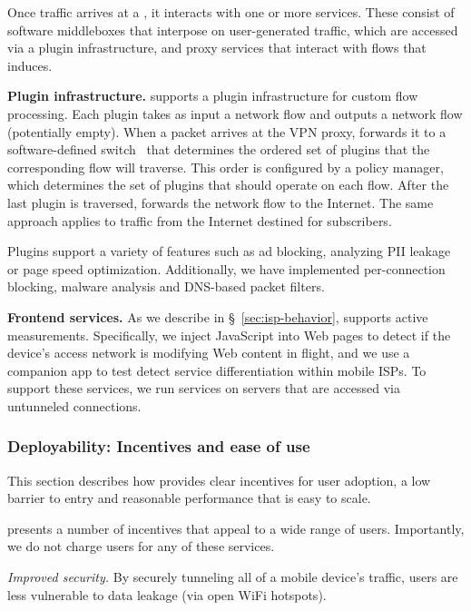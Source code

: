 Once traffic arrives at a \meddlebox, it interacts with one or more 
services. These consist of software middleboxes that interpose on 
user-generated traffic, which are accessed 
via a plugin infrastructure, and proxy services that interact with 
flows that \meddle induces.  

\noindent\textbf{Plugin infrastructure.}
\platname{} supports a plugin
infrastructure for custom flow processing. Each plugin takes as input a 
network flow and outputs a network flow (potentially empty). 
When a packet arrives at the VPN proxy, \meddle forwards it to a software-defined switch~\cite{Openvswitch} that 
determines the ordered set of plugins that the corresponding flow will traverse. 
This order is configured by a policy manager, which determines 
the set of plugins that should operate on each flow. After the last 
plugin is traversed, \meddle forwards the network flow to the Internet. 
The same approach applies to traffic from the Internet destined for \meddle subscribers. 

Plugins support a variety of features such as ad blocking, 
analyzing PII leakage or page speed optimization. Additionally, we have implemented 
per-connection blocking, malware analysis and DNS-based packet filters. 

\noindent\textbf{Frontend services.} As we describe in \S~\ref{sec:isp-behavior}, 
\meddle supports active measurements. 
Specifically, we inject JavaScript into Web pages to detect if the device's 
access network is modifying Web content in flight, and we use a companion app to 
test detect service differentiation within mobile ISPs. To support these services, we 
run services on \meddle servers that are accessed via untunneled connections. 

\subsubsection{Deployability: Incentives and ease of use}
\label{subsec:design_deploy}

This section describes how \meddle provides clear incentives for user adoption, a 
low barrier to entry and reasonable performance that is easy to scale.

 \meddle presents a number of incentives 
that appeal to a wide range of users. Importantly, we do not charge users for any of these 
services.

\noindent \emph{Improved security.} By securely tunneling all of a mobile device's traffic, users 
are less vulnerable to data leakage (\eg via open WiFi hotspots). 

